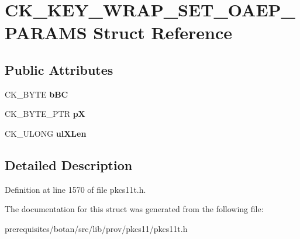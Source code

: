 \hypertarget{struct_c_k___k_e_y___w_r_a_p___s_e_t___o_a_e_p___p_a_r_a_m_s}{}\section{C\+K\+\_\+\+K\+E\+Y\+\_\+\+W\+R\+A\+P\+\_\+\+S\+E\+T\+\_\+\+O\+A\+E\+P\+\_\+\+P\+A\+R\+A\+MS Struct Reference}
\label{struct_c_k___k_e_y___w_r_a_p___s_e_t___o_a_e_p___p_a_r_a_m_s}
\subsection*{Public Attributes}
\begin{DoxyCompactItemize}
\item 
\mbox{\label{struct_c_k___k_e_y___w_r_a_p___s_e_t___o_a_e_p___p_a_r_a_m_s_a1f3cb5ec14d0842ca41e2a93beb4415f}} 
C\+K\+\_\+\+B\+Y\+TE {\bfseries b\+BC}
\item 
\mbox{\label{struct_c_k___k_e_y___w_r_a_p___s_e_t___o_a_e_p___p_a_r_a_m_s_a1a897d4e201679b8114b516ea168efa6}} 
C\+K\+\_\+\+B\+Y\+T\+E\+\_\+\+P\+TR {\bfseries pX}
\item 
\mbox{\label{struct_c_k___k_e_y___w_r_a_p___s_e_t___o_a_e_p___p_a_r_a_m_s_a42f36d257351e4712540a5f8116076d2}} 
C\+K\+\_\+\+U\+L\+O\+NG {\bfseries ul\+X\+Len}
\end{DoxyCompactItemize}


\subsection{Detailed Description}


Definition at line 1570 of file pkcs11t.\+h.



The documentation for this struct was generated from the following file\+:\begin{DoxyCompactItemize}
\item 
prerequisites/botan/src/lib/prov/pkcs11/pkcs11t.\+h\end{DoxyCompactItemize}
